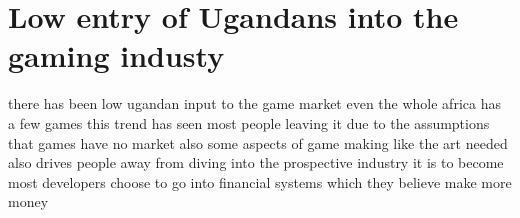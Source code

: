 \documentclass[12pt]{article}
\begin{document}
\section*{Low entry of Ugandans into the gaming industy}

there has been low ugandan input to the game market even the whole africa has a few games
this trend has seen most people leaving it due to the assumptions that games have no market
also some aspects of game making like the art needed also drives people away from diving into the 
prospective industry it is to become
most developers choose to go into financial systems which they believe make more money
\end{document}
